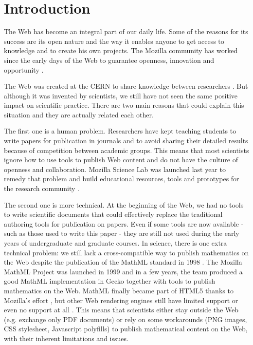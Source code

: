 \section*{Introduction}

The Web has become an integral part of our daily life. Some of the reasons for
its success are its open nature and the way it enables anyone to get access to
knowledge and to create his own projects. The Mozilla community has worked since
the early days of the Web to guarantee openness, innovation and opportunity
\cite{MozillaMission}.

The Web was created at the CERN to share knowledge between researchers
\cite{WebCreation}.
But although it was invented by scientists, we still have not seen
the same positive impact on scientific practice. There are two main reasons that
could explain this situation and they are actually related each other.

The first one is a human problem. Researchers have kept teaching students
to write papers for publication in journals and to avoid sharing their detailed
results because of competition between academic groups. This means that most
scientists ignore
how to use tools to publish Web content and do not have the culture of openness
and collaboration. Mozilla Science Lab was launched last year to remedy that
problem and build educational resources, tools and prototypes for the research
community \cite{MozillaScienceLab}.

The second one is more technical. At the beginning of the Web, we had no tools
to write scientific documents that could effectively replace the traditional
authoring tools for publication on papers.
Even if some tools are now available - such as those used to write this paper -
they are still not used
during the early years of undergraduate and graduate courses.
In science, there is one extra technical problem:
we still lack a cross-compatible way to publish
mathematics on the Web despite the publication of the MathML standard in 1998
\cite{W3CMathHome}.
The Mozilla MathML Project \cite{MozillaMathML}
was launched in 1999 and in a few years, the team produced a good MathML
implementation in Gecko together with tools to publish mathematics on the Web.
MathML finally
became part of HTML5 thanks to Mozilla's effort \cite{MozillaMathMLHTML5},
but other Web rendering
engines still have limited support or even no support at all
\cite{MathMLForgesOn}. This means that
scientists either stay outside the Web (e.g. exchange only PDF documents) or
rely on some workarounds (PNG images, CSS stylesheet, Javascript polyfills)
to publish mathematical content on the Web, with their inherent limitations and
issues.

